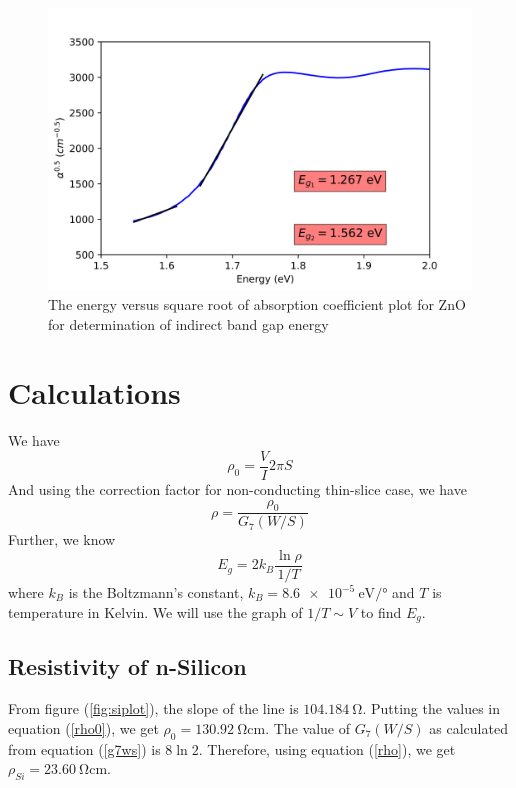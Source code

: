\documentclass[%
 aip,
 amsmath,amssymb,
 reprint,%
]{revtex4-1}
\begin{document}
\begin{figure}
    \centering
    \includegraphics[scale = 0.56]{Figures/plot-1b-Polymer.png}
    \caption{The energy versus square root of absorption coefficient plot for ZnO for determination of indirect band gap energy}
    \label{fig:polymerplot}
\end{figure}
\section{Calculations}
We have
\begin{equation}
\label{rho0}
    \rho_0 = \dfrac{V}{I} 2 \pi S
\end{equation}
And using the correction factor for non-conducting thin-slice case, we have
\begin{equation}
\label{rho}
    \rho = \dfrac{\rho_0}{G_7 (W/S)}
\end{equation}
Further, we know
\begin{equation}
\label{kbt}
    E_g = 2 k_B \dfrac{\ln \rho}{1/T}
\end{equation}
where $k_B$ is the Boltzmann's constant, $k_B = \SI{8.6e-5}{\electronvolt \per \degree}$ and $T$ is temperature in Kelvin. We will use the graph of $1/T \sim V$ to find $E_g$. 
\subsection{Resistivity of n-Silicon}
From figure (\ref{fig:siplot}), the slope of the line is $\SI{104.184}{\ohm}$. Putting the values in equation (\ref{rho0}), we get $\rho_0 = \SI{130.92}{\ohm \centi \metre}$. The value of $G_7 (W/S)$ as calculated from equation (\ref{g7ws}) is $8 \ln 2$. Therefore, using equation (\ref{rho}), we get $\rho_{Si} = \SI{23.60}{\ohm \centi \metre}$.
\end{document}
